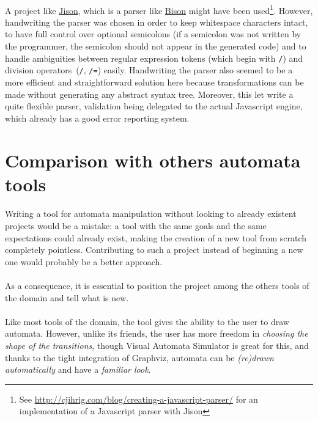 \documentclass{article}
\begin{document}
\begin{sloppypar}
      
\paragraph{}
A project like \href{http://zaach.github.io/jison/}{Jison}, which is a parser like \href{http://www.gnu.org/software/bison/}{Bison} might have been used\footnote{See \href{http://cjihrig.com/blog/creating-a-javascript-parser/}{http://cjihrig.com/blog/creating-a-javascript-parser/} for an implementation of a Javascript parser with Jison}. However, handwriting the parser was chosen in order to keep whitespace characters intact, to have full control over optional semicolons (if a semicolon was not written by the programmer, the semicolon should not appear in the generated code) and to handle ambiguities between regular expression tokens (which begin with \lstinline!/!) and division operators (\lstinline!/!, \lstinline!/=!) easily. Handwriting the parser also seemed to be a more efficient and straightforward solution here because transformations can be made without generating any abstract syntax tree. Moreover, this let write a quite flexible parser, validation being delegated to the actual Javascript engine, which already has a good error reporting system.
   




\section{ Comparison with others automata tools}


\paragraph{}
Writing a tool for automata manipulation without looking to already existent projects would be a mistake: a tool with the same goals and the same expectations could already exist, making the creation of a new tool from scratch completely pointless. Contributing to such a project instead of beginning a new one would probably be a better approach.

   
\paragraph{}
As a consequence, it is essential to position the project among the others tools of the domain and tell what is new.

   
\paragraph{}
Like most tools of the domain, the tool gives the ability to the user to draw automata. However, unlike its friends, the user has more freedom in {\em choosing the shape of the transitions}, though Visual Automata Simulator is great for this, and thanks to the tight integration of Graphviz, automata can be {\em (re)drawn automatically} and have a {\em familiar look}.
   

\end{sloppypar}
\end{document}
